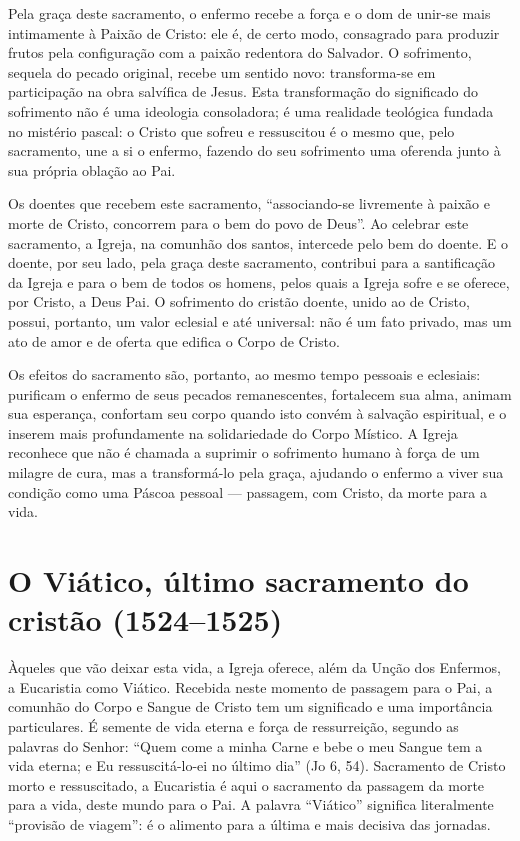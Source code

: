 Pela graça deste sacramento, o enfermo recebe a força e o dom de unir-se mais intimamente à Paixão de Cristo: ele é, de certo modo, consagrado para produzir frutos pela configuração com a paixão redentora do Salvador. O sofrimento, sequela do pecado original, recebe um sentido novo: transforma-se em participação na obra salvífica de Jesus. Esta transformação do significado do sofrimento não é uma ideologia consoladora; é uma realidade teológica fundada no mistério pascal: o Cristo que sofreu e ressuscitou é o mesmo que, pelo sacramento, une a si o enfermo, fazendo do seu sofrimento uma oferenda junto à sua própria oblação ao Pai.

Os doentes que recebem este sacramento, ``associando-se livremente à paixão e morte de Cristo, concorrem para o bem do povo de Deus''. Ao celebrar este sacramento, a Igreja, na comunhão dos santos, intercede pelo bem do doente. E o doente, por seu lado, pela graça deste sacramento, contribui para a santificação da Igreja e para o bem de todos os homens, pelos quais a Igreja sofre e se oferece, por Cristo, a Deus Pai. O sofrimento do cristão doente, unido ao de Cristo, possui, portanto, um valor eclesial e até universal: não é um fato privado, mas um ato de amor e de oferta que edifica o Corpo de Cristo.

Os efeitos do sacramento são, portanto, ao mesmo tempo pessoais e eclesiais: purificam o enfermo de seus pecados remanescentes, fortalecem sua alma, animam sua esperança, confortam seu corpo quando isto convém à salvação espiritual, e o inserem mais profundamente na solidariedade do Corpo Místico. A Igreja reconhece que não é chamada a suprimir o sofrimento humano à força de um milagre de cura, mas a transformá-lo pela graça, ajudando o enfermo a viver sua condição como uma Páscoa pessoal --- passagem, com Cristo, da morte para a vida.

\section{O Viático, último sacramento do cristão (1524--1525)}

Àqueles que vão deixar esta vida, a Igreja oferece, além da Unção dos Enfermos, a Eucaristia como Viático. Recebida neste momento de passagem para o Pai, a comunhão do Corpo e Sangue de Cristo tem um significado e uma importância particulares. É semente de vida eterna e força de ressurreição, segundo as palavras do Senhor: ``Quem come a minha Carne e bebe o meu Sangue tem a vida eterna; e Eu ressuscitá-lo-ei no último dia'' (Jo 6, 54). Sacramento de Cristo morto e ressuscitado, a Eucaristia é aqui o sacramento da passagem da morte para a vida, deste mundo para o Pai. A palavra ``Viático'' significa literalmente ``provisão de viagem'': é o alimento para a última e mais decisiva das jornadas.

